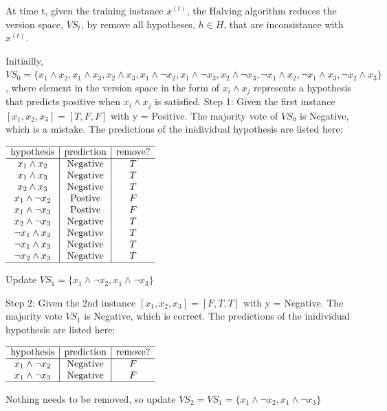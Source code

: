 \documentclass[paper=a4, fontsize=11pt]{scrartcl} %
\numberwithin{equation}{section} %
\numberwithin{figure}{section} %
\numberwithin{table}{section} %
\begin{document}
At time t, given the training instance $x^{(t)}$, the Halving algorithm reduces the version space, $VS_t$, by remove all hypotheses, $h \in H$, that are inconsistance with $x^{(t)}$. 
\bigbreak

Initiailly, $VS_0 = 
\{
x_1 \land x_2, x_1 \land x_3, x_2 \land x_3,
x_1 \land \neg x_2, x_1 \land \neg x_3, x_2 \land \neg x_3,
\neg x_1 \land x_2, \neg x_1 \land x_3, \neg x_2 \land x_3
\}$, where element in the version space in the form of $x_i \land x_j$ represents a hypothesis that predicts positive when $x_i \land x_j$ is satisfied. 
\bigbreak
Step 1: Given the first instance $[x_1,x_2,x_3] = [T,F,F]$ with y = Positive. The majority vote of $VS_0$ is Negative, which is a mistake. The predictions of the inidividual hypothesis are listed here: 

\begin{center}
$
\begin{array}{c|c|c}
\hline
\text{hypothesis} & \text{prediction} & \text{remove?} \\
\hline
x_1 \land x_2 & \text{Negative} & T \\ 
x_1 \land x_3 & \text{Negative} & T \\ 
x_2 \land x_3 & \text{Negative} & T \\ 
x_1 \land \neg x_2 & \text{Postive} & F \\ 
x_1 \land \neg x_3 & \text{Postive} & F \\ 
x_2 \land \neg x_3 & \text{Negative} & T \\ 
\neg x_1 \land x_2 & \text{Negative} & T \\ 
\neg x_1 \land x_3 & \text{Negative} & T \\ 
\neg x_2 \land x_3 & \text{Negative} & T \\ 
\hline
\end{array}
$
\end{center}

Update $VS_1 = 
\{
x_1 \land \neg x_2, x_1 \land \neg x_3
\}$

\smallbreak
Step 2: Given the 2nd instance $[x_1,x_2,x_3] = [F,T,T]$ with y = Negative. The majority vote $VS_1$ is Negative, which is correct. The predictions of the inidividual hypothesis are listed here: 
\begin{center}
$
\begin{array}{c|c|c}
\hline
\text{hypothesis} & \text{prediction} & \text{remove?} \\
\hline
x_1 \land \neg x_2 & \text{Negative} &  F\\ 
x_1 \land \neg x_3 & \text{Negative} &  F \\ 
\hline
\end{array}
$
\end{center}
Nothing needs to be removed, so update $VS_2 = VS_1 = 
\{
x_1 \land \neg x_2, x_1 \land \neg x_3
\}$
\end{document}
